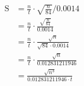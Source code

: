 \documentclass{article}
\begin{document}
\begin{align*}
  \text{S} & = \frac{n}{t} \cdot \sqrt{\frac{n}{84}} / 0.0014 \\
  & = \frac{n}{t} \cdot \frac{\sqrt{\frac{n}{84}}}{0.0014} \\
  & = \frac{n}{t} \cdot \frac{\sqrt{n}}{\sqrt{84}\cdot 0.0014} \\
  & = \frac{n}{t} \cdot \frac{\sqrt{n}}{0.012831211946} \\
  & = \frac{\sqrt{n^3}}{0.012831211946\cdot t} \\
\end{align*}
\end{document}
